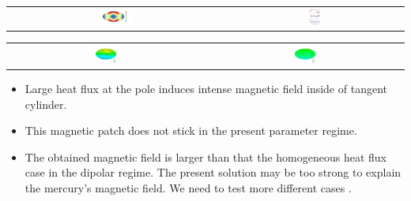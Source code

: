 \documentclass[landscape,a0b,final]{a0poster}
\begin{document}
\begin{multicols}{3}
\begin{center}
\begin{tabular}{cc}
 \includegraphics[width=0.18\textwidth]{CMB_flux.pdf} &
 \includegraphics[width=0.08\textwidth]{gauss_coefficients.pdf} \\
\end{tabular}
\label{flux}
\end{center}

\begin{center}
\begin{tabular}{cc}
 \includegraphics[width=0.12\textwidth]{br_cmb_x0.png} &
 \includegraphics[width=0.12\textwidth]{br_cmb_x10.png}
\end{tabular}
\label{dynamo}
\end{center}

\begin{itemize}
\item Large heat flux at the pole induces intense magnetic field inside of tangent cylinder.
\item This magnetic patch does not stick in the present parameter regime.
\item The obtained magnetic field is larger than that  the homogeneous heat flux case in the dipolar regime. The present solution may be too strong to explain the mercury's magnetic field. We need to test more different cases .
\end{itemize}


\end{multicols}
\end{document}
